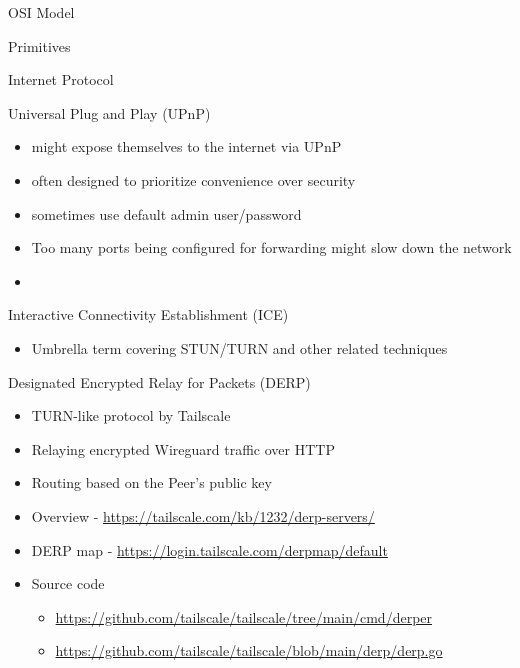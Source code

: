 \begin{frame}[fragile]{OSI Model}
\begin{block}{Primitives}
\begin{block}{Internet Protocol}
\begin{block}{Universal Plug and Play (UPnP)}
\begin{itemize}
\begin{itemize}
    \begin{itemize}
    \tightlist
    \item
      might expose themselves to the internet via UPnP
    \item
      often designed to prioritize convenience over security
    \item
      sometimes use default admin user/password
    \item
      Too many ports being configured for forwarding might slow down the
      network
    \item
    \end{itemize}
  \end{itemize}
\end{itemize}
\end{block}

\begin{block}{Interactive Connectivity Establishment (ICE)}
\protect\hypertarget{interactive-connectivity-establishment-ice}{}
\begin{itemize}
\tightlist
\item
  Umbrella term covering STUN/TURN and other related techniques
\end{itemize}
\end{block}

\begin{block}{Designated Encrypted Relay for Packets (DERP)}
\protect\hypertarget{designated-encrypted-relay-for-packets-derp}{}
\begin{itemize}
\item
  TURN-like protocol by Tailscale
\item
  Relaying encrypted Wireguard traffic over HTTP
\item
  Routing based on the Peer's public key
\item
  Overview - \url{https://tailscale.com/kb/1232/derp-servers/}
\item
  DERP map - \url{https://login.tailscale.com/derpmap/default}
\item
  Source code

  \begin{itemize}
  \item
    \url{https://github.com/tailscale/tailscale/tree/main/cmd/derper}
  \item
    \url{https://github.com/tailscale/tailscale/blob/main/derp/derp.go}
  \end{itemize}
\end{itemize}
\end{block}
\end{block}


\end{block}
\end{frame}
